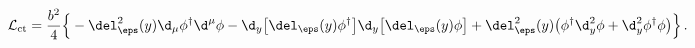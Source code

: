 \begin{equation}
\mathcal{L}_{\mathrm{ct}}= \frac{b^2}{4}\Big\{ - \del_\eps^2(y) \d_\mu
\phi^\dagger \d^\mu \phi - \d_y \big[\del_\eps(y) \phi^\dagger \big]
\d_y \big[\del_\eps(y) \phi \big] + \del_\eps^2(y) \big(\phi^\dagger
\d_y^2 \phi + \d_y^2 \phi^\dagger \phi \big) \Big\} \,
.\label{scalarcounter} 
\end{equation}

